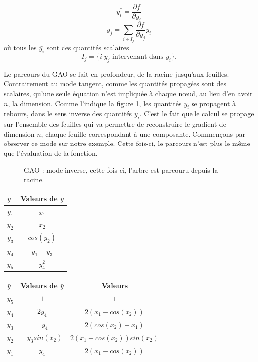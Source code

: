 $$y_i^*= \frac{\partial f}{\partial y_i} $$
$$\bar{y_j}= \sum_{i \in I_j} \frac{\partial f}{\partial y_j}\bar{y_i}$$
o\`u tous les $\bar{y_i}$ sont des quantit\'es scalaires
 $$I_j=\{i | y_j \text{ intervenant dans } y_i\}.$$


Le parcours du GAO se fait en profondeur, de la racine jusqu'aux feuilles. Contrairement au mode tangent,
comme les quantit\'es propag\'ees sont des scalaires, qu'une seule \'equation n'est impliqu\'ee \`a chaque n\oe ud,
 au lieu d'en avoir $n$, la dimension. Comme l'indique la figure \ref{fig:modeinverse}, les quantit\'es $\bar{y_i}$ se
propagent \`a rebours, dans le sens inverse des quantit\'es $\dot{y_i}$. C'est le fait
que le calcul se propage sur l'ensemble des feuilles qui va permettre de reconstruire le gradient de dimension $n$, chaque feuille
correspondant \`a une composante.
Commençons par observer ce mode sur notre exemple. Cette fois-ci, le parcours n'est plus le même que 
l'\'evaluation de la fonction.


\begin{figure}
\caption{GAO : mode inverse, cette fois-ci, l'arbre est parcouru depuis la racine.}
\begin{center}
\end{center}
\label{fig:modeinverse}
\end{figure}


\vspace{1cm}
\begin{tabular}{|l|c|}
  \hline
  $y$ & Valeurs de $y$ \\
  \hline
  $y_1$ & $x_1$ \\
  $y_2$ & $x_2$ \\
  $y_3$ & $cos(y_2)$ \\
  $y_4$ & $y_1-y_3$ \\
  $y_5$ & $y_4^2$ \\
  \hline
\end{tabular}
\hspace{1cm}
\begin{tabular}{|l|c|c|}
  \hline
 $\bar{y}$ & Valeurs de $\bar{y}$ & Valeurs \\
  \hline
 $\bar{y_5}$ & $1$ & $1$ \\
 $\bar{y_4}$ & $2y_4$ & $2(x_1-cos(x_2))$ \\
 $\bar{y_3}$ & $-\bar{y_4}$ & $2(cos(x_2)-x_1)$ \\
 $\bar{y_2}$ & $-\bar{y_3}sin(x_2)$ & $2(x_1-cos(x_2))sin(x_2)$ \\
 $\bar{y_1}$ & $\bar{y_4}$ & $2(x_1-cos(x_2))$ \\
  \hline
\end{tabular}\\

